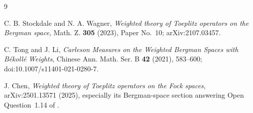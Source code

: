 \documentclass[11pt]{article}
\begin{document}
\begin{thebibliography}{9}

C. B. Stockdale and N. A. Wagner,
\emph{Weighted theory of Toeplitz operators on the Bergman space},
Math. Z. \textbf{305} (2023), Paper No.~10;
arXiv:2107.03457.

C. Tong and J. Li,
\emph{Carleson Measures on the Weighted Bergman Spaces with B\'ekoll\'e
Weights}, Chinese Ann. Math. Ser. B \textbf{42} (2021), 583--600;
doi:10.1007/s11401-021-0280-7.

J. Chen,
\emph{Weighted theory of Toeplitz operators on the Fock spaces},
arXiv:2501.13571 (2025), especially its Bergman-space section answering
Open Question~1.14 of \cite{SW}.

\end{thebibliography}
\end{document}
